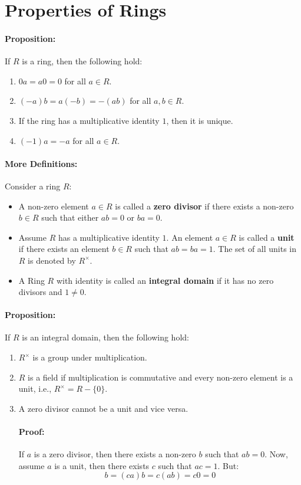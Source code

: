 \documentclass[12pt, oneside]{book}
\begin{document}
\section{Properties of Rings}
\paragraph{Proposition:} If \(R\) is a ring, then the following hold:
\begin{enumerate}
    \item \(0a = a0 = 0\) for all \(a \in R\).
    \item \((-a)b = a(-b) = -(ab)\) for all \(a, b \in R\).
    \item If the ring has a multiplicative identity \(1\), then it is unique.
    \item \((-1)a = -a\) for all \(a \in R\).
\end{enumerate}
\paragraph{More Definitions:} Consider a ring \(R\):
\begin{itemize}
    \item A non-zero element \(a \in R\) is called a \textbf{zero divisor} if there exists a non-zero \(b \in R\) such that either \(ab = 0\) or \(ba = 0\).
    \item Assume \(R\) has a multiplicative identity \(1\).
    An element \(a \in R\) is called a \textbf{unit} if there exists an element \(b \in R\) such that \(ab = ba = 1\).
    The set of all units in \(R\) is denoted by \(R^\times\).
    \item A Ring \(R\) with identity is called an \textbf{integral domain} if it has no zero divisors and \(1 \neq 0\).
\end{itemize}
\paragraph{Proposition:} If \(R\) is an integral domain, then the following hold:
\begin{enumerate}
    \item \(R^\times\) is a group under multiplication.
    \item \(R\) is a field if multiplication is commutative and every non-zero element is a unit, i.e., \(R^\times = R - \{0\}\).
    \item A zero divisor cannot be a unit and vice versa.
    \paragraph{Proof:} If \(a\) is a zero divisor, then there exists a non-zero \(b\) such that \(ab = 0\).
    Now, assume \(a\) is a unit, then there exists \(c\) such that \(ac = 1\).
    But:
    \[b = (ca)b = c(ab) = c0 = 0\]
\end{enumerate}
\end{document}
